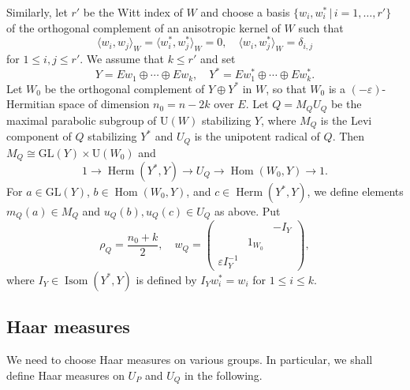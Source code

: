 \documentclass[11pt]{amsart}
\numberwithin{equation}{section}
\theoremstyle{plain}
\theoremstyle{definition}
\theoremstyle{remark}
\def\Herm{\operatorname{Herm}}
\def\Hom{\operatorname{Hom}}
\def\Isom{\operatorname{Isom}}
\def\GL{\mathrm{GL}}
\def\U{\mathrm{U}}
\begin{document}
Similarly, let $r'$ be the Witt index of $W$ and choose a basis $\{ w_i, w_i^* \, | \, i = 1, \ldots, r' \}$ of the orthogonal complement of an anisotropic kernel of $W$ such that 
\[
 \langle w_i, w_j \rangle_W = \langle w^*_i, w^*_j \rangle_W = 0, \quad \langle w_i, w^*_j \rangle_W = \delta_{i,j}
\]
for $1 \le i, j \le r'$.
We assume that $k \le r'$ and set 
\[
 Y = E w_1  \oplus \cdots \oplus E w_k, \quad Y^* = E w^*_1 \oplus \cdots \oplus E w^*_k.
\]
Let $W_0$ be the orthogonal complement of $Y \oplus Y^*$ in $W$, so that $W_0$ is a $(- \varepsilon)$-Hermitian space of dimension $n_0 = n -2k$ over $E$.
Let $Q = M_Q U_Q$ be the maximal parabolic subgroup of $\U(W)$ stabilizing $Y$, where $M_Q$ is the Levi component of $Q$ stabilizing $Y^*$ and $U_Q$ is the unipotent radical of $Q$.
Then $M_Q \cong \GL(Y) \times \U(W_0)$ and 
\[
 1 \longrightarrow \Herm(Y^*,Y) \longrightarrow U_Q \longrightarrow 
 \Hom(W_0, Y) \longrightarrow 1.
\]
For $a \in \GL(Y)$, $b \in \Hom(W_0, Y)$, and $c \in \Herm(Y^*,Y)$,
we define elements $m_Q(a) \in M_Q$ and $u_Q(b), u_Q(c) \in U_Q$ as above.
Put
\[
 \rho_Q = \frac{n_0+k}{2}, \quad
 w_Q =
 \begin{pmatrix}
  & & -I_Y \\
  & 1_{W_0} & \\
  \varepsilon I_Y^{-1} & & 
 \end{pmatrix},
\]
where $I_Y \in \Isom(Y^*, Y)$ is defined by $I_Y w_i^* = w_i$ for $1 \le i \le k$.

\subsection{Haar measures}

We need to choose Haar measures on various groups.
In particular, we shall define Haar measures on $U_P$ and $U_Q$ in the following.
\end{document}
